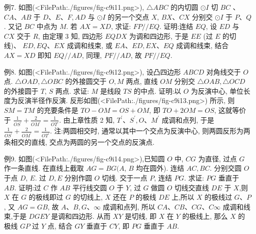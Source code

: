 例7. 如图(<FilePath:./figures/fig-c9i11.png>), $\triangle A B C$ 的内切圆 $\odot I$ 切 $B C$ 、 $C A 、 A B$ 于 $D 、 E 、 F, A D$ 与 $\odot I$ 的另一个交点 $X$, $B X 、 C X$ 分别交 $\odot I$ 于 $P 、 Q$. 又记 $B C$ 中点为 $M$. 若 $A X=X D$, 求证: $F P / / E Q$.
证明:连结 $E Q$, 设 $E D$ 与 $C X$ 交于 $R$, 由定理 3 知, 四边形 $E Q D X$ 为调和四边形, 于是 $E E$ (过 $E$ 的切线)、 $E D, E Q 、 E X$ 成调和线束, 或 $E A 、 E D, E X 、 E Q$ 成调和线束, 结合 $A X=X D$ 即知 $E Q / / A D$, 同理, $P F / / A D$, 故 $P F / / E Q$.



例8. 如图(<FilePath:./figures/fig-c9i12.png>), 设凸四边形 $A B C D$ 对角线交于 $O$ 点.
$\triangle O A D, \triangle O B C$ 的外接圆交于 $O, M$ 两点, 直线 $O M$ 分别交 $\triangle O A B, \triangle O C D$ 的外接圆于 $T$, $S$ 两点.
求证: $M$ 是线段 $T S$ 的中点.
证明:以 $O$ 为反演中心, 单位长度为反演半径作反演.
反形如图(<FilePath:./figures/fig-c9i13.png>) 所示, 则 $S M=T M$ 的充要条件是 $T O-O M=O S+O M$, 即 $T O+2 O M=O S$, 这就等价于 $\frac{1}{O S^{\prime}}+\frac{2}{O M^{\prime}}=\frac{1}{O T^{\prime}}$.
由上章性质 2 知, $T^{\prime} 、 S^{\prime}, O 、 M^{\prime}$ 成调和点列, 于是 $\frac{1}{O S^{\prime}}+\frac{2}{O M^{\prime}}=\frac{1}{O T^{\prime}}$.
注:两圆相交时, 通常以其中一个交点为反演中心, 则两圆反形为两条相交的直线, 交点为两圆的另一个交点的反演点.



例9. 如图(<FilePath:./figures/fig-c9i14.png>),已知圆 $O$ 中, $C G$ 为直径, 过点 $G$ 作一条直线.
在直线上截取 $A G=B G(A$, $B$ 均在圆外). 连结 $A C, B C$. 分别交圆 $O$ 于点 $D$, $E$. 过 $D, E$ 分别作圆 $O$ 切线.
交于一点 $P$, 连结 $P G$. 求证: $P G$ 垂直于 $A B$.
证明:过 $C$ 作 $A B$ 平行线交圆 $O$ 于 $Y$, 过 $G$ 做圆 $O$ 切线交直线 $D E$ 于 $X$,则 $X$ 在 $G$ 的极线即过 $G$ 的切线上, $X$ 还在 $P$ 的极线 $D E$ 上,所以 $X$ 的极线过 $G 、 P$, 又 $A G=G B$, 故 $A 、 B, G 、 \infty$ 成调和点列, 所以 $C A 、 C B 、 C G 、 C \infty$ 成调和线束,于是 $D G E Y$ 是调和四边形.
从而 $X Y$ 是切线, 即 $X$ 在 $Y$ 的极线上, 那么 $X$ 的极线 $G P$ 过 $Y$ 点, 结合 $G Y$ 垂直于 $C Y$, 即 $P G$ 垂直于 $A B$.



